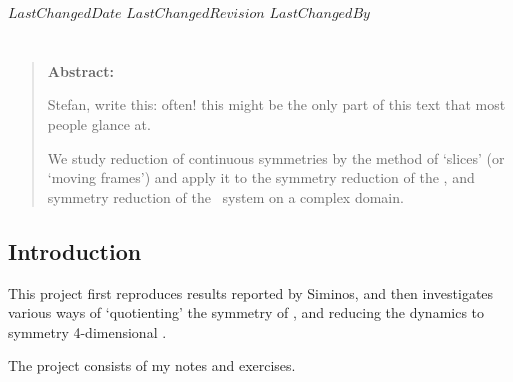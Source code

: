 
{$LastChangedDate$}
{$LastChangedRevision$} {$LastChangedBy$}


\chapter{\CLf}
\label{chap:CLF}

\begin{quote}
{\bf Abstract:}
    {\color{red}
Stefan, write this: often! this might be the only part
of this text that most people glance at.

We study reduction of continuous symmetries by the
method of `slices' (or `moving frames') and apply it to
the  symmetry reduction of the \cLf, and
 symmetry reduction of the \KS\ system
on a complex domain.
    }
\end{quote}

\section{Introduction}
\label{sect:intro}
This project first reproduces results reported by
Siminos, and then investigates various ways
of `quotienting' the  symmetry of \cLe, and reducing
the dynamics to symmetry 4-dimensional \reducedsp.


The project consists of my notes and exercises.

